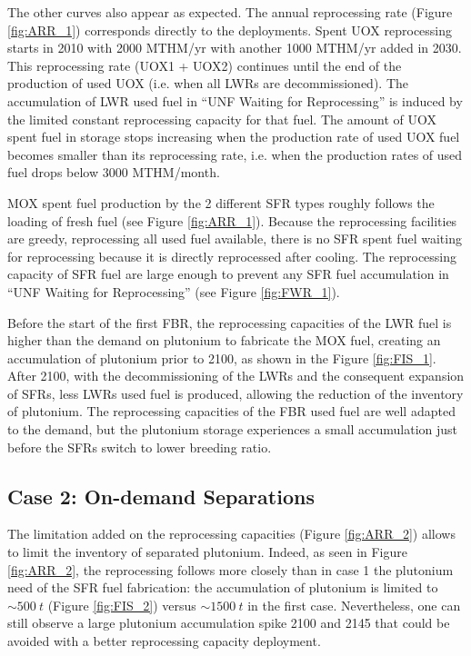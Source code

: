 \documentclass[12pt]{article}
\begin{document}
The other curves also appear as expected. The annual reprocessing rate (Figure
\ref{fig:ARR_1}) corresponds directly to the deployments. Spent UOX
reprocessing starts in 2010 with 2000 MTHM/yr with another 1000 MTHM/yr added in
2030. This reprocessing rate (UOX1 + UOX2) continues until the end of the
production of used UOX (i.e. when all LWRs are decommissioned).
The accumulation of LWR used fuel in ``UNF Waiting for Reprocessing'' is induced
by the limited constant reprocessing capacity for that fuel. The amount of UOX
spent fuel in storage stops increasing when the production rate of used UOX fuel
becomes smaller than its reprocessing rate, i.e. when the production rates of used
fuel drops below $3000$ MTHM/month.
 
MOX spent fuel production by the 2 different SFR types roughly follows the
loading of fresh fuel (see Figure \ref{fig:ARR_1}). Because the reprocessing
facilities are greedy, reprocessing all used fuel available, there is no SFR
spent fuel waiting for reprocessing because it is directly reprocessed after
cooling. The reprocessing capacity of SFR fuel are large enough to prevent any
SFR fuel accumulation in ``UNF Waiting for Reprocessing'' (see Figure
\ref{fig:FWR_1}).

Before the start of the first FBR, the reprocessing capacities of the LWR fuel
is higher than the demand on plutonium to fabricate the MOX fuel, creating an
accumulation of plutonium prior to 2100, as shown in the Figure
\ref{fig:FIS_1}. After 2100, with the decommissioning of the LWRs and the
consequent expansion of SFRs, less LWRs used fuel is produced, allowing the
reduction of the inventory of plutonium. The reprocessing capacities of the FBR
used fuel are well adapted to the demand, but the plutonium storage experiences
a small accumulation just before the SFRs switch to lower breeding ratio.
 

\subsection{Case 2: On-demand Separations}

The limitation added on the reprocessing capacities (Figure \ref{fig:ARR_2})
allows to limit the inventory of separated plutonium. Indeed, as seen in Figure
\ref{fig:ARR_2}, the reprocessing follows more closely than in case 1 the
plutonium need of the SFR fuel fabrication: the accumulation of plutonium is
limited to $\sim500~t$ (Figure \ref{fig:FIS_2}) versus $\sim1500~t$ in the first
case. Nevertheless, one can still observe a large plutonium accumulation spike
2100 and 2145 that could be avoided with a better reprocessing capacity
deployment.
\end{document}
